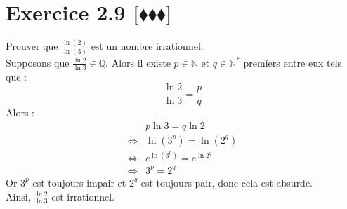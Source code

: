 \documentclass[10pt]{article}
\begin{document}
\section*{Exercice 2.9 [$\blacklozenge\blacklozenge\blacklozenge$]}
\begin{tcolorbox}[enhanced, width=6in, center, size=fbox, fontupper=\large, drop shadow southwest]
    Prouver que $\frac{\ln(2)}{\ln(3)}$ est un nombre irrationnel.\\
    Supposons que $\frac{\ln{2}}{\ln{3}}\in\mathbb{Q}$. Alors il existe $p\in\mathbb{N}$ et $q\in\mathbb{N}^*$ premiers entre eux tels que :
    \begin{equation*}
        \frac{\ln{2}}{\ln{3}}=\frac{p}{q}
    \end{equation*}
    Alors :
    \begin{align*}
        &p\ln{3}=q\ln{2}\\
        \iff&\ln(3^p)=\ln(2^q)\\
        \iff&e^{\ln(3^p)}=e^{\ln{2^q}}\\
        \iff&3^p=2^q
    \end{align*}
    Or $3^p$ est toujours impair et $2^q$ est toujours pair, donc cela est absurde.\\
    Ainsi, $\frac{\ln2}{\ln3}$ est irrationnel.
\end{tcolorbox}
\end{document}
